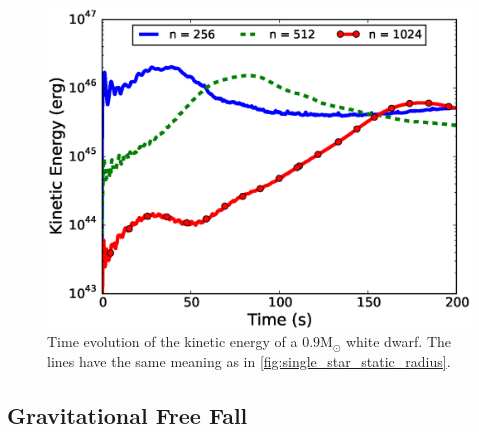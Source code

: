 \documentclass[iop]{../emulateapj}
\newcommand{\msolar}{\mathrm{M}_\odot}
\begin{document}
\begin{figure}
  \centering
  \includegraphics[scale=0.45]{plots/single_star_static_ke}
  \caption{Time evolution of the kinetic energy of a $0.9 \msolar$ 
    white dwarf. The lines have the same meaning as in \autoref{fig:single_star_static_radius}.
    \label{fig:single_star_static_ke}}
\end{figure}

\subsection{Gravitational Free Fall}\label{sec:Gravitational Free Fall}
\end{document}
